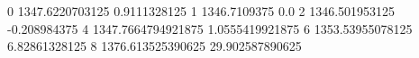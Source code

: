 0 1347.6220703125 0.9111328125
1 1346.7109375 0.0
2 1346.501953125 -0.208984375
4 1347.7664794921875 1.0555419921875
6 1353.53955078125 6.82861328125
8 1376.613525390625 29.902587890625
